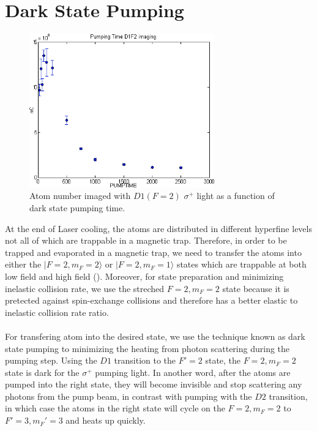 \section{Dark State Pumping}\label{exp:pump}
\begin{figure}
  \begin{center}
    \includegraphics[width=8cm]{mf-pump.png}
  \end{center}
  \caption{Atom number imaged with $D1 (F=2)$ $\sigma^+$ light as a function of dark state pumping time.}
  \label{exp:mf-pump-time}
\end{figure}
At the end of Laser cooling, the atoms are distributed in different hyperfine levels not all of which are trappable in a magnetic trap. Therefore, in order to be trapped and evaporated in a magnetic trap, we need to transfer the atoms into either the $|F=2, m_F=2\rangle$ or $|F=2, m_F=1\rangle$ states which are trappable at both low field and high field (\label{theory:li7}). Moreover, for state preparation and minimizing inelastic collision rate, we use the streched $F=2, m_F=2$ state because it is pretected against spin-exchange collisions and therefore has a better elastic to inelastic collision rate ratio.\\
\\
For transfering atom into the desired state, we use the technique known as dark state pumping to minimizing the heating from photon scattering during the pumping step. Using the $D1$ transition to the $F'=2$ state, the $F=2, m_F=2$ state is dark for the $\sigma^+$ pumping light. In another word, after the atoms are pumped into the right state, they will become invisible and stop scattering any photons from the pump beam, in contrast with pumping with the $D2$ transition, in which case the atoms in the right state will cycle on the $F=2, m_F=2$ to $F'=3, m_F'=3$ and heats up quickly.\\
\\
